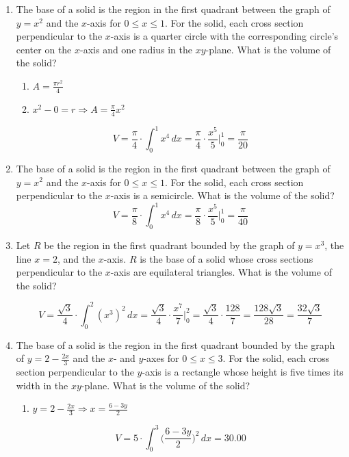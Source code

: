 \documentclass[12pt]{article}
\begin{document}
\begin{enumerate}
    \item The base of a solid is the region in the first quadrant between the graph of $y=x^2$ and the $x$-axis for $0 \leq x \leq 1$. For the solid, each cross section perpendicular to the $x$-axis is a quarter circle with the corresponding circle’s center on the $x$-axis and one radius in the $xy$-plane. What is the volume of the solid?
    \begin{enumerate}
        \item $A=\frac{\pi r^2}{4}$ 
        \item $x^2-0= r \Longrightarrow A = \frac{\pi}{4} x^2$
    \end{enumerate}
    $$V=\frac{\pi}{4} \cdot \int_{0}^{1} x^4 \, dx = \frac{\pi}{4}\cdot \frac{x^5}{5}\biggr\rvert_{0}^{1} = \boxed{\frac{\pi}{20}}$$
\newpage
    \item The base of a solid is the region in the first quadrant between the graph of $y=x^2$ and the $x$-axis for $0 \leq x \leq 1$. For the solid, each cross section perpendicular to the $x$-axis is a semicircle. What is the volume of the solid?
    $$V=\frac{\pi}{8}\cdot \int_{0}^{1} x^4 \, dx = \frac{\pi}{8} \cdot \frac{x^5}{5}\biggr\rvert_{0}^{1} =\boxed{ \frac{\pi}{40}}$$

    \item Let $R$ be the region in the first quadrant bounded by the graph of $y=x^3$, the line $x=2$, and the $x$-axis. $R$ is the base of a solid whose cross sections perpendicular to the $x$-axis are equilateral triangles. What is the volume of the solid?

    $$V=\frac{\sqrt{3}}{4} \cdot \int_{0}^{2} (x^3)^2 \, dx = \frac{\sqrt{3}}{4} \cdot \frac{x^7}{7}\biggr\rvert_{0}^{2} = \frac{\sqrt{3}}{4} \cdot \frac{128}{7} = \frac{128\sqrt{3}}{28}=\boxed{\frac{32\sqrt{3}}{7}}$$
    
    \item The base of a solid is the region in the first quadrant bounded by the graph of $y=2-\frac{2x}{3}$ and the $x$- and $y$-axes for $0 \leq x \leq 3$. For the solid, each cross section perpendicular to the $y$-axis is a rectangle whose height is five times its width in the $xy$-plane. What is the volume of the solid?
    \begin{enumerate}
        \item $y=2-\frac{2x}{3} \Longrightarrow x=\frac{6-3y}{2}$
    \end{enumerate}
    $$V=5 \cdot \int_{0}^{3} \biggr(\frac{6-3y}{2}\biggr)^2 \, dx= \boxed{30.00}$$
    

\end{enumerate}
\end{document}
